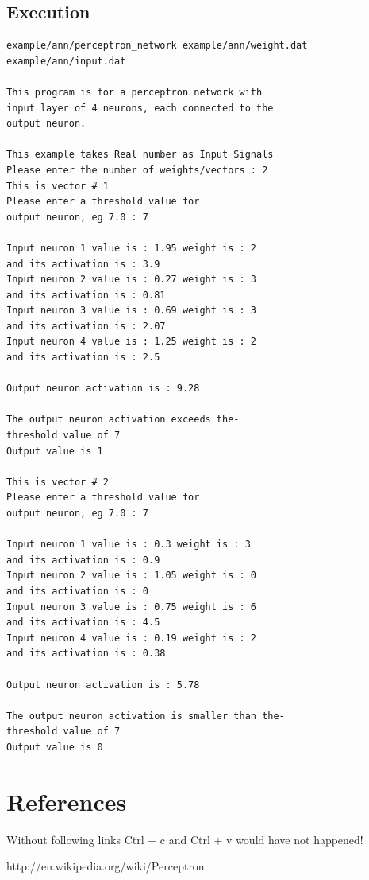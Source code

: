\documentclass[12pt, right open]{memoir}
\begin{document}
\subsection{Execution}
\begin{lstlisting}[caption={perceptron\_netwotk.cpp output}] %language=C++, 
example/ann/perceptron_network example/ann/weight.dat example/ann/input.dat

This program is for a perceptron network with  
input layer of 4 neurons, each connected to the 
output neuron.

This example takes Real number as Input Signals
Please enter the number of weights/vectors : 2
This is vector # 1
Please enter a threshold value for 
output neuron, eg 7.0 : 7

Input neuron 1 value is : 1.95 weight is : 2  
and its activation is : 3.9
Input neuron 2 value is : 0.27 weight is : 3  
and its activation is : 0.81
Input neuron 3 value is : 0.69 weight is : 3  
and its activation is : 2.07
Input neuron 4 value is : 1.25 weight is : 2  
and its activation is : 2.5

Output neuron activation is : 9.28

The output neuron activation exceeds the-
threshold value of 7
Output value is 1

This is vector # 2
Please enter a threshold value for 
output neuron, eg 7.0 : 7

Input neuron 1 value is : 0.3 weight is : 3  
and its activation is : 0.9
Input neuron 2 value is : 1.05 weight is : 0  
and its activation is : 0
Input neuron 3 value is : 0.75 weight is : 6  
and its activation is : 4.5
Input neuron 4 value is : 0.19 weight is : 2  
and its activation is : 0.38

Output neuron activation is : 5.78

The output neuron activation is smaller than the- 
threshold value of 7
Output value is 0
\end{lstlisting}

\section{References}
Without following links Ctrl + c and Ctrl + v would have not happened!

http://en.wikipedia.org/wiki/Perceptron
\end{document}
